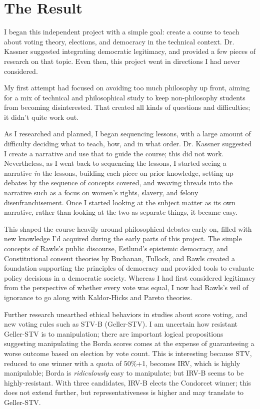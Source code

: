 
\chapter{The Result}

I began this independent project with a simple goal:  create a course to teach about voting theory, elections, and democracy in the technical context.  Dr. Kassner suggested integrating democratic legitimacy, and provided a few pieces of research on that topic.  Even then, this project went in directions I had never considered.

My first attempt had focused on avoiding too much philosophy up front, aiming for a mix of technical and philosophical study to keep non-philosophy students from becoming disinterested.  That created all kinds of questions and difficulties; it didn't quite work out.

As I researched and planned, I began sequencing lessons, with a large amount of difficulty deciding what to teach, how, and in what order.  Dr. Kassner suggested I create a narrative and use that to guide the course; this did not work.  Nevertheless, as I went back to sequencing the lessons, I started seeing a narrative \textit{in} the lessons, building each piece on prior knowledge, setting up debates by the sequence of concepts covered, and weaving threads into the narrative such as a focus on women's rights, slavery, and felony disenfranchisement.  Once I started looking at the subject matter as its own narrative, rather than looking at the two as separate things, it became easy.

This shaped the course heavily around philosophical debates early on, filled with new knowledge I'd acquired during the early parts of this project.  The simple concepts of Rawls's public discourse, Estlund's epistemic democracy, and Constitutional consent theories by Buchanan, Tullock, and Rawls created a foundation supporting the principles of democracy and provided tools to evaluate policy decisions in a democratic society.  Whereas I had first considered legitimacy from the perspective of whether every vote was equal, I now had Rawls's veil of ignorance to go along with Kaldor-Hicks and Pareto theories.

Further research unearthed ethical behaviors in studies about score voting, and new voting rules such as STV-B (Geller-STV).  I am uncertain how resistant Geller-STV is to manipulation; there are important logical propositions suggesting manipulating the Borda scores comes at the expense of guaranteeing a worse outcome based on election by vote count.  This is interesting because STV, reduced to one winner with a quota of 50\%+1, becomes IRV, which is highly manipulable; Borda is \textit{ridiculously} easy to manipulate; but IRV-B seems to be highly-resistant.  With three candidates, IRV-B elects the Condorcet winner; this does not extend further, but representativeness is higher and may translate to Geller-STV.

